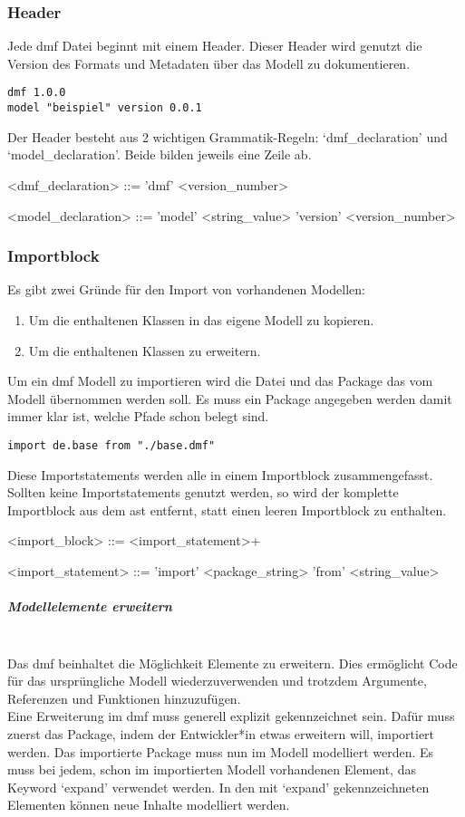\documentclass[./einleitung.tex]{subfiles}
\begin{document}
\subsubsection{Header}
Jede \acrshort{dmf} Datei beginnt mit einem Header.
Dieser Header wird genutzt die Version des Formats und Metadaten über das Modell zu dokumentieren.
\begin{lstlisting}[caption={Header einer \acrshort{dmf}-Modelldatei}]
dmf 1.0.0
model "beispiel" version 0.0.1
\end{lstlisting}
Der Header besteht aus 2 wichtigen Grammatik-Regeln: `dmf_declaration' und `model_declaration'.
Beide bilden jeweils eine Zeile ab.

\begin{grammar}
<dmf_declaration> ::= 'dmf' <version_number>

<model_declaration> ::= 'model' <string_value> 'version' <version_number>
\end{grammar}

\subsubsection{Importblock}
Es gibt zwei Gründe für den Import von vorhandenen Modellen:
\begin{enumerate}
\item Um die enthaltenen Klassen in das eigene Modell zu kopieren.
\item Um die enthaltenen Klassen zu erweitern.
\end{enumerate}
Um ein \acrshort{dmf} Modell zu importieren wird die Datei und das Package das vom Modell übernommen werden soll.
Es muss ein Package angegeben werden damit immer klar ist, welche Pfade schon belegt sind.
\begin{lstlisting}[caption={Import des Package de.base}]
import de.base from "./base.dmf"
\end{lstlisting}
Diese Importstatements werden alle in einem Importblock zusammengefasst.
Sollten keine Importstatements genutzt werden, so wird der komplette Importblock aus dem \acrshort{ast} entfernt, statt einen leeren Importblock zu enthalten.
\begin{grammar}
<import_block> ::= <import_statement>+

<import_statement> ::= 'import' <package_string> 'from' <string_value>
\end{grammar}

\subparagraph{Modellelemente erweitern}\mbox{}\\
Das \acrshort{dmf} beinhaltet die Möglichkeit Elemente zu erweitern.
Dies ermöglicht Code für das ursprüngliche Modell wiederzuverwenden und trotzdem Argumente, Referenzen und Funktionen hinzuzufügen. \\
Eine Erweiterung im \acrshort{dmf} muss generell explizit gekennzeichnet sein.
Dafür muss zuerst das Package, indem der Entwickler*in etwas erweitern will, importiert werden.
Das importierte Package muss nun im Modell modelliert werden.
Es muss bei jedem, schon im importierten Modell vorhandenen Element, das Keyword `expand' verwendet werden.
In den mit `expand' gekennzeichneten Elementen können neue Inhalte modelliert werden.
\end{document}
